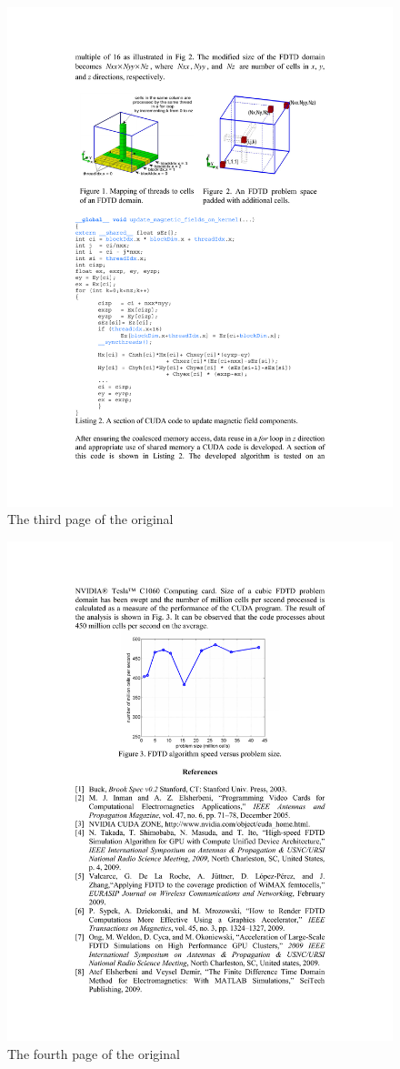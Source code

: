 \begin{figure}[h]
	\centering
	\includegraphics[width=1\linewidth]{../pics/p03}
	\caption{The third page of the original}
	\label{fig:p03}
\end{figure}

\begin{figure}[h]
	\centering
	\includegraphics[width=1\linewidth]{../pics/p04}
	\caption{The fourth page of the original}
	\label{fig:p04}
\end{figure}